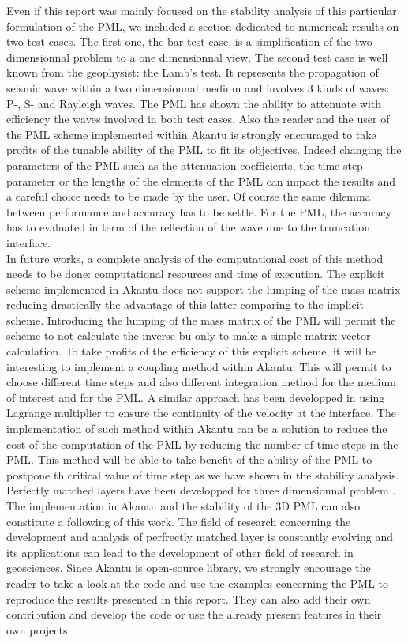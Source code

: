 Even if this report was mainly focused on the stability analysis of this particular formulation of the PML, we included a section dedicated to numericak results on two test cases. The first one, the bar test case, is a simplification of the two dimensionnal problem to a one dimensionnal view. The second test case is well known from the geophysist: the Lamb's test. It represents the propagation of seismic wave within a two dimensionnal medium and involves $3$ kinds of waves: P-, S- and Rayleigh waves. The PML has shown the ability to attenuate with efficiency the waves involved in both test cases. Also the reader and the user of the PML scheme implemented within Akantu is strongly encouraged to take profits of the tunable ability of the PML to fit its objectives. Indeed changing the parameters of the PML such as the attenuation coefficients, the time step parameter or the lengths of the elements of the PML can impact the results and a careful choice needs to be made by the user. Of course the same dilemma between performance and accuracy has to be settle. For the PML, the accuracy has to evaluated in term of the reflection of the wave due to the truncation interface.\\     
In future works, a complete analysis of the computational cost of this method needs to be done: computational resources and time of execution. The explicit scheme implemented in Akantu does not support the lumping of the mass matrix reducing drastically the advantage of this latter comparing to the implicit scheme. Introducing the lumping of the mass matrix of the PML will permit the scheme to not calculate the inverse bu only to make a simple matrix-vector calculation. To take profits of the efficiency of this explicit scheme, it will be interesting to implement a coupling method within Akantu. This will permit to choose different time steps and also different integration method for the medium of interest and for the PML. A similar approach has been developped in \cite{Brun2016} using Lagrange multiplier to ensure the continuity of the velocity at the interface. The implementation of such method within Akantu can be a solution to reduce the cost of the computation of the PML by reducing the number of time steps in the PML. This method will be able to take benefit of the ability of the PML to postpone th critical value of time step as we have shown in the stability analysis. \\
Perfectly matched layers have been developped for three dimensionnal problem \cite{Basu2008}. The implementation in Akantu and the stability of the 3D PML can also constitute a following of this work. The field of research concerning the development and analysis of perfrectly matched layer is constantly evolving and its applications can lead to the development of other field of research in geosciences. Since Akantu is open-source library, we strongly encourage the reader to take a look at the code and use the examples concerning the PML to reproduce the results presented in this report. They can also add their own contribution and develop the code or use the already present features in their own projects.       




